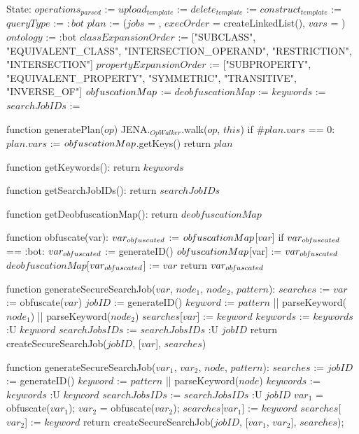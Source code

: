 State:
    $operations_{parsed}$ := {}
    $upload_{template}$ := {}
    $delete_{template}$ := {}
    $construct_{template}$ := {}
    $queryType$ := $:bot$
    $plan$ := ($jobs$ = {}, $execOrder$ = createLinkedList(), $vars$ = {})
    $ontology$ := :bot
    $classExpansionOrder$ := ["SUBCLASS", "EQUIVALENT_CLASS", "INTERSECTION_OPERAND", "RESTRICTION", "INTERSECTION"]
    $propertyExpansionOrder$ := ["SUBPROPERTY", "EQUIVALENT_PROPERTY", "SYMMETRIC", "TRANSITIVE", "INVERSE_OF"]
    $ob\textrm{\emph{f}}uscationMap$ := {}
    $deobfuscationMap$ := {}
    $keywords$ := {}
    $searchJobIDs$ := {}

function generatePlan($op$) 
    JENA.$_{OpWalker}$.walk($op$, $this$)
    if $\#plan.vars$ == 0:
        $plan.vars$ := $ob\textrm{\emph{f}}uscationMap$.getKeys()
    return $plan$

function getKeywords():
    return $keywords$

function getSearchJobIDs():
    return $searchJobIDs$    

function getDeobfuscationMap():
    return $deobfuscationMap$

function obfuscate(var):
    $var_{ob\textrm{\emph{f}}uscated}$ := $ob\textrm{\emph{f}}uscationMap$[$var$]
    if $var_{ob\textrm{\emph{f}}uscated}$ == :bot:
        $var_{ob\textrm{\emph{f}}uscated}$ := generateID()
        $ob\textrm{\emph{f}}uscationMap$[var] := $var_{ob\textrm{\emph{f}}uscated}$
        $deobfuscationMap$[$var_{ob\textrm{\emph{f}}uscated}$] := $var$
    return $var_{ob\textrm{\emph{f}}uscated}$

function generateSecureSearchJob($var$, $node_1$, $node_2$, $pattern$):
    $searches$ := {}
    $var$ := obfuscate($var$)
    $jobID$ := generateID()
    $keyword$ := $pattern$ || parseKeyword($node_1$) || parseKeyword($node_2$)
    $searches$[$var$] := $keyword$
    $keywords$ := $keywords$ :U { $keyword$ }
    $searchJobsIDs$ := $searchJobsIDs$ :U { $jobID$ }
    return createSecureSearchJob($jobID$, [$var$], $searches$)

function generateSecureSearchJob($var_1$, $var_2$, $node$, $pattern$):
    $searches$ := {}
    $jobID$ := generateID()
    $keyword$ := $pattern$ || parseKeyword($node$)
    $keywords$ := $keywords$ :U { $keyword$ }
    $searchJobsIDs$ := $searchJobsIDs$ :U { $jobID$ }
    $var_1$ = obfuscate($var_1$);
    $var_2$ = obfuscate($var_2$);
    $searches$[$var_1$] := $keyword$
    $searches$[$var_2$] := $keyword$
    return createSecureSearchJob($jobID$, [$var_1$, $var_2$], $searches$);

